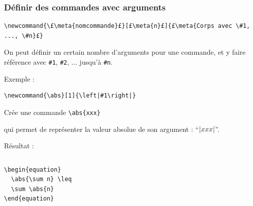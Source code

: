 \documentclass{beamer}
\newcommand{\abs}[1]{\ensuremath\left|#1\right|}
\begin{document}
\begin{frame}[fragile]
  \frametitle{Définir des commandes avec arguments}

\begin{lstlisting}
\newcommand{\£\meta{nomcommande}£}[£\meta{n}£]{£\meta{Corps avec \#1, ..., \#n}£}
\end{lstlisting}
On peut définir un certain nombre d'arguments  pour une commande, et y faire référence avec \lstinline?#1?, \lstinline?#2?, ... jusqu'à \lstinline?#n?.

\bigskip
Exemple :
\begin{lstlisting}
\newcommand{\abs}[1]{\left|#1\right|}
\end{lstlisting}
Crée une commande \lstinline?\abs{xxx}?

qui permet de représenter la valeur absolue de son argument : “$\abs{xxx}$”.

\bigskip
Résultat :
\begin{columns}
\begin{column}{.45\textwidth}
\begin{lstlisting}
\begin{equation}
  \abs{\sum n} \leq
  \sum \abs{n}
\end{equation}
\end{lstlisting}
\end{column}

\begin{column}{.45\textwidth}
\myex{%
\begin{equation}
  \abs{\sum n} \leq
  \sum \abs{n}
\end{equation}
}
\end{column}
\end{columns}

\end{frame}
\end{document}
